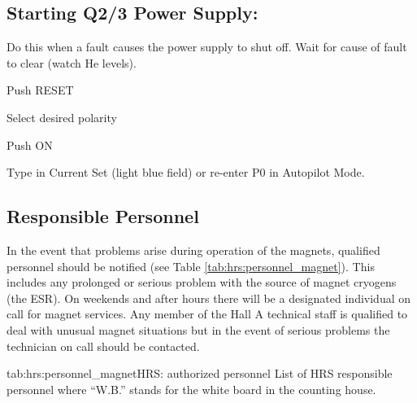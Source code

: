 {\subsection{Starting Q2/3 Power Supply:}

 Do this when a fault causes the power supply to shut off.
 Wait for cause of fault to clear (watch He levels). 
 \begin{list}{.~}{\setlength{\itemsep}{-0.15cm}}
   \item Push RESET 
   \item Select desired polarity
   \item Push ON
   \item Type in Current Set (light blue field) or re-enter P0 in Autopilot Mode.
\end{list}
}

\begin{safetyen}{0}{0}
\subsection{Responsible Personnel}

In the event that problems arise during 
operation of the magnets, qualified personnel should be notified
(see Table \ref{tab:hrs:personnel_magnet}).  
This includes any prolonged or serious problem with the source of magnet 
cryogens (the ESR).  On weekends and after hours there will be a 
designated individual on call for magnet services.  Any member of the 
Hall A technical staff is qualified to deal with unusual magnet 
situations but in the event of serious problems the technician on
call should be contacted.

\begin{namestab}{tab:hrs:personnel_magnet}{HRS: authorized personnel}{%
      List of HRS responsible personnel where ``W.B.'' stands for the white board 
      in the counting house.}
   \EdFolts{}
   \JackSegal{}
   \HeidiFansler{}
   \JessieButler{}
   \AndrewLumanog{}
   \JasonGlorioso{}
   \MahlonLong{}
\end{namestab}

\end{safetyen}

